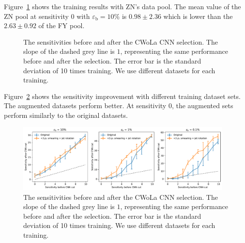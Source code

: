 \documentclass[12pt]{article}
\begin{document}
        Figure~\ref{fig:sensitivity_improvement_ZN_pool_larger_testing_data} shows the training results with ZN's data pool. The mean value of the ZN pool at sensitivity 0 with $\varepsilon_{\text{b}} = 10\%$ is $0.98 \pm 2.36$ which is lower than the $2.63 \pm 0.92$ of the FY pool.
        \begin{figure}[htpb]
            \centering
            \caption{The sensitivities before and after the CWoLa CNN selection. The slope of the dashed grey line is $1$, representing the same performance before and after the selection. The error bar is the standard deviation of 10 times training. We use different datasets for each training.}
            \label{fig:sensitivity_improvement_ZN_pool_larger_testing_data}
        \end{figure}

        Figure~\ref{fig:sensitivity_improvement_background_subtraction_larger_testing_data} shows the sensitivity improvement with different training dataset sets. The augmented datasets perform better. At sensitivity 0, the augmented sets perform similarly to the original datasets.
        \begin{figure}[htpb]
            \centering
            \includegraphics[width=0.97\textwidth]{HVmodel_sensitivity_improvement_origin_pt_jet_aug_3_bkg_subtraction_larger_testing_set.pdf}
            \caption{The sensitivities before and after the CWoLa CNN selection. The slope of the dashed grey line is $1$, representing the same performance before and after the selection. The error bar is the standard deviation of 10 times training. We use different datasets for each training.}
            \label{fig:sensitivity_improvement_background_subtraction_larger_testing_data}
        \end{figure}
\end{document}

